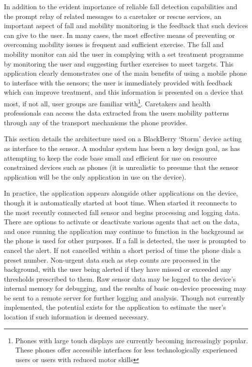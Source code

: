 \documentclass[conference,a4paper]{IEEEtran}
\begin{document}
In addition to the evident importance of reliable fall detection capabilities and the prompt relay of related messages to a caretaker or rescue services, an important aspect of fall and mobility monitoring is the feedback that such devices can give to the user.
In many cases, the most effective means of preventing or overcoming mobility issues is frequent and sufficient exercise.
The fall and mobility monitor can aid the user in complying with a set treatment programme by monitoring the user and suggesting further exercises to meet targets.
This application clearly demonstrates one of the main benefits of using a mobile phone to interface with the sensors; the user is immediately provided with feedback which can improve treatment, and this information is presented on a device that most, if not all, user groups are familiar with\footnote{Phones with large touch displays are currently becoming increasingly popular. These phones offer accessible interfaces for less technologically experienced users or users with reduced motor skills}.
Caretakers and health professionals can access the data extracted from the users mobility patterns through any of the transport mechanisms the phone provides.

This section details the architecture used on a BlackBerry `Storm' device acting as interface to the sensor. A modular system has been a key design goal, as has attempting to keep the code base small and efficient for use on resource constrained devices such as phones (it is unrealistic to presume that the sensor application will be the only application in use on the device).

In practice, the application appears alongside other applications on the device, though it is automatically started at boot time. When started it reconnects to the most recently connected fall sensor and begins processing and logging data. There are options to activate or deactivate various agents that act on the data, and once running the application may continue to function in the background as the phone is used for other purposes. If a fall is detected, the user is prompted to cancel the alert. If not cancelled within a short period of time the phone dials a preset number. Non-urgent data such as step counts are processed in the background, with the user being alerted if they have missed or exceeded any thresholds prescribed to them. Raw sensor data may be logged to the device's internal memory for debugging, and the results of basic on-device processing may be sent to a remote server for further logging and analysis. Though not currently implemented, the potential exists for the application to estimate the user's location if such information is deemed necessary.
\end{document}
